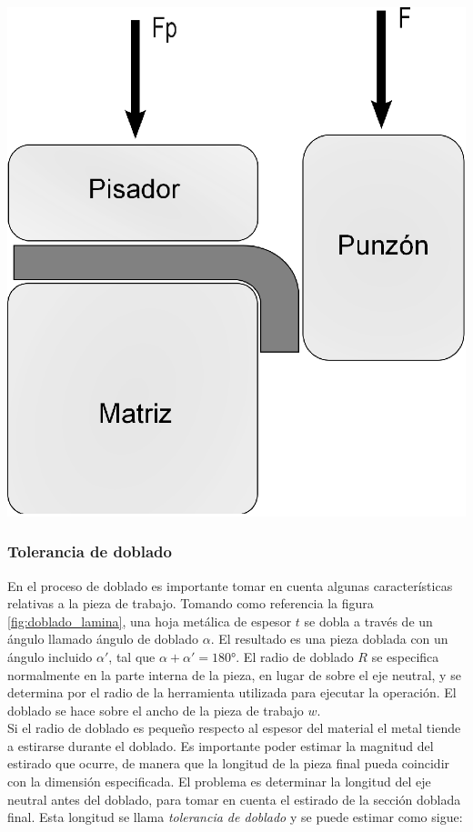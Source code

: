 \begin{center}
\includegraphics[scale=0.4]{src/ch2/doblado_bordes.eps}
\label{fig:doblado_bordes}
\end{center}


\subsubsection{Tolerancia de doblado}

En el proceso de doblado es importante tomar en cuenta algunas características relativas a la 
pieza de trabajo. Tomando como referencia la figura \ref{fig:doblado_lamina}, una hoja metálica 
de espesor $t$ se dobla a través de un ángulo llamado ángulo de doblado $\alpha$. El  resultado 
es una pieza doblada con un ángulo incluido $\alpha'$, tal que $\alpha + \alpha' = 180°$. 
El radio de doblado $R$ se especifica normalmente en la parte interna de la pieza, en lugar de 
sobre el eje neutral, y se determina por el radio de la herramienta utilizada para ejecutar 
la operación. El doblado se hace sobre el ancho de la pieza de trabajo $w$. ~\cite{groover2007}\\

Si el radio de doblado es pequeño respecto al espesor del material el metal tiende a estirarse 
durante el doblado. Es importante poder estimar la magnitud del estirado que ocurre, de manera 
que la longitud de la pieza final pueda coincidir con la dimensión especificada. El problema 
es determinar la longitud del eje neutral antes del doblado, para tomar en cuenta el estirado 
de la sección doblada final. Esta longitud se llama \textit{tolerancia de doblado} y se puede 
estimar como sigue: ~\cite{groover2007}

